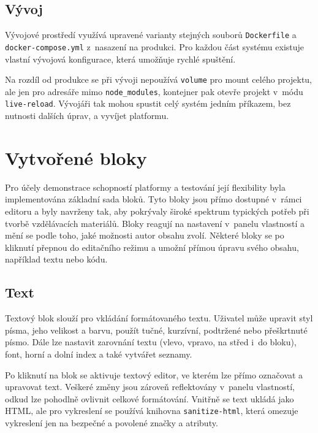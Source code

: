 \subsection{Vývoj}

Vývojové prostředí využívá upravené varianty stejných souborů \texttt{Dockerfile} a \texttt{docker-compose.yml} z~nasazení na produkci. 
Pro každou část systému existuje vlastní vývojová konfigurace, která umožňuje rychlé spuštění.

Na rozdíl od produkce se při vývoji nepoužívá \texttt{volume} pro mount celého projektu, ale jen pro adresáře mimo \texttt{node\_modules}, kontejner pak otevře projekt v~módu \texttt{live-reload}.
Vývojáři tak mohou spustit celý systém jedním příkazem, bez nutnosti dalších úprav, a vyvíjet platformu.

\section{Vytvořené bloky}\label{text:realizace/vytvoreneBloky}

Pro účely demonstrace schopností platformy a testování její flexibility byla implementována základní sada bloků.
Tyto bloky jsou přímo dostupné v~rámci editoru a byly navrženy tak, aby pokrývaly široké spektrum typických potřeb při tvorbě vzdělávacích materiálů. 
Bloky reagují na nastavení v~panelu vlastností a mění se podle toho, jaké možnosti autor obsahu zvolí. 
Některé bloky se po kliknutí přepnou do editačního režimu a umožní přímou úpravu svého obsahu, například textu nebo kódu. 

\subsection{Text}

Textový blok slouží pro vkládání formátovaného textu. 
Uživatel může upravit styl písma, jeho velikost a barvu, použít tučné, kurzívní, podtržené nebo přeškrtnuté písmo. 
Dále lze nastavit zarovnání textu (vlevo, vpravo, na střed i~do bloku), font, horní a dolní index a také vytvářet seznamy. 

Po kliknutí na blok se aktivuje textový editor, ve kterém lze přímo označovat a upravovat text. 
Veškeré změny jsou zároveň reflektovány v~panelu vlastností, odkud lze pohodlně ovlivnit celkové formátování. 
Vnitřně se text ukládá jako HTML, ale pro vykreslení se používá knihovna \texttt{sanitize-html}, která omezuje vykreslení jen na bezpečné a povolené značky a atributy.

